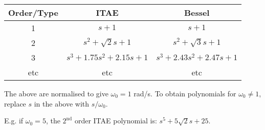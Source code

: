 \begin{tabular}{|c|c|c|}
\hline
\textbf{Order/Type} & \textbf{ITAE} & \textbf{Bessel}\\
\hline
1 & $s+1$ & $s+1$\\
\hline
2 & $s^2+\sqrt{2}s+1$ & $s^2+\sqrt{3}s+1$\\
\hline
3 & $s^3+1.75s^2+2.15s+1$ & $s^3+2.43s^2+2.47s+1$\\
\hline
etc & etc & etc\\
\hline
\end{tabular}

The above are normalised to give $\omega_0=1$ rad/s. To obtain polynomials for $\omega_0\ne 1$, replace $s$ in the above with $s/\omega_0$.

E.g. if $\omega_0=5$, the $2^\mathrm{nd}$ order ITAE polynomial is: $s^5+5\sqrt{2}s+25$.

\endinput

